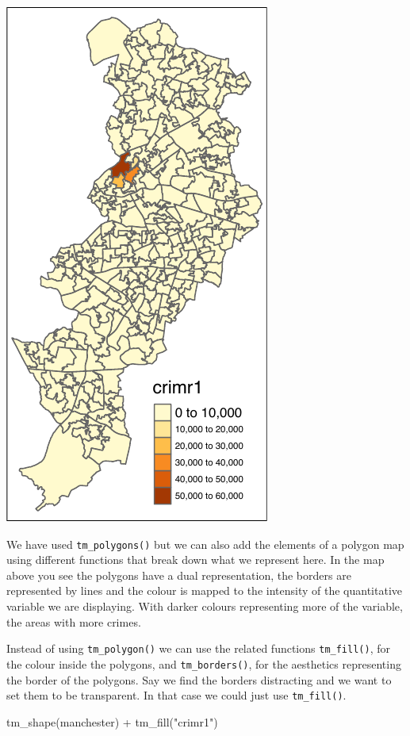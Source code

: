 \documentclass[
]{book}
\newenvironment{Shaded}{\begin{snugshade}}{\end{snugshade}}
\newcommand{\FunctionTok}[1]{\textcolor[rgb]{0.00,0.00,0.00}{#1}}
\newcommand{\NormalTok}[1]{#1}
\newcommand{\SpecialCharTok}[1]{\textcolor[rgb]{0.00,0.00,0.00}{#1}}
\newcommand{\StringTok}[1]{\textcolor[rgb]{0.31,0.60,0.02}{#1}}
\begin{document}
\includegraphics{crime_mapping_files/figure-latex/unnamed-chunk-84-1.pdf}

We have used \texttt{tm\_polygons()} but we can also add the elements of a polygon map using different functions that break down what we represent here. In the map above you see the polygons have a dual representation, the borders are represented by lines and the colour is mapped to the intensity of the quantitative variable we are displaying. With darker colours representing more of the variable, the areas with more crimes.

Instead of using \texttt{tm\_polygon()} we can use the related functions \texttt{tm\_fill()}, for the colour inside the polygons, and \texttt{tm\_borders()}, for the aesthetics representing the border of the polygons. Say we find the borders distracting and we want to set them to be transparent. In that case we could just use \texttt{tm\_fill()}.

\begin{Shaded}
\begin{Highlighting}[]
\FunctionTok{tm\_shape}\NormalTok{(manchester) }\SpecialCharTok{+} 
  \FunctionTok{tm\_fill}\NormalTok{(}\StringTok{"crimr1"}\NormalTok{)}
\end{Highlighting}
\end{Shaded}
\end{document}

